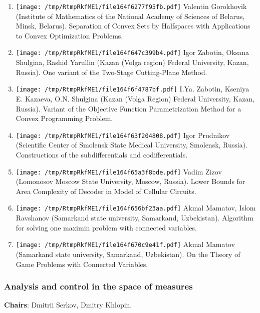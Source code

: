 \documentclass[
]{article}
\providecommand{\tightlist}{%
  \setlength{\itemsep}{0pt}\setlength{\parskip}{0pt}}
\begin{document}
\begin{enumerate}
\def\labelenumi{\arabic{enumi}.}
\tightlist
\item
  \protect\texttt{[image: /tmp/RtmpRkfME1/file164f6277f95fb.pdf]}
  Valentin Gorokhovik (Institute of Mathematics of the National Academy
  of Sciences of Belarus, Minsk, Belarus). Separation of Convex Sets by
  Halfspaces with Applications to Convex Optimization Problems.
\item
  \protect\texttt{[image: /tmp/RtmpRkfME1/file164f647c399b4.pdf]}
  Igor Zabotin, Oksana Shulgina, Rashid Yarullin (Kazan (Volga region)
  Federal University, Kazan, Russia). One variant of the Two-Stage
  Cutting-Plane Method.
\item
  \protect\texttt{[image: /tmp/RtmpRkfME1/file164f6f4787bf.pdf]}
  I.Ya. Zabotin, Kseniya E. Kazaeva, O.N. Shulgina (Kazan (Volga Region)
  Federal University, Kazan, Russia). Variant of the Objective Function
  Parametrization Method for a Convex Programming Problem.
\item
  \protect\texttt{[image: /tmp/RtmpRkfME1/file164f63f204808.pdf]}
  Igor Prudnikov (Scientific Center of Smolensk State Medical
  University, Smolensk, Russia). Constructions of the subdifferentials
  and codifferentials.
\item
  \protect\texttt{[image: /tmp/RtmpRkfME1/file164f65a3f8bde.pdf]}
  Vadim Zizov (Lomonosov Moscow State University, Moscow, Russia). Lower
  Bounds for Area Complexity of Decoder in Model of Cellular Circuits.
\item
  \protect\texttt{[image: /tmp/RtmpRkfME1/file164f656bf23aa.pdf]}
  Akmal Mamatov, Islom Ravshanov (Samarkand state university, Samarkand,
  Uzbekistan). Algorithm for solving one maximin problem with connected
  variables.
\item
  \protect\texttt{[image: /tmp/RtmpRkfME1/file164f670c9e41f.pdf]}
  Akmal Mamatov (Samarkand state university, Samarkand, Uzbekistan). On
  the Theory of Game Problems with Connected Variables.
\end{enumerate}

\hypertarget{meas}{%
\subsubsection{Analysis and control in the space of
measures}\label{meas}}

\textbf{Chairs}: Dmitrii Serkov, Dmitry Khlopin.
\end{document}
